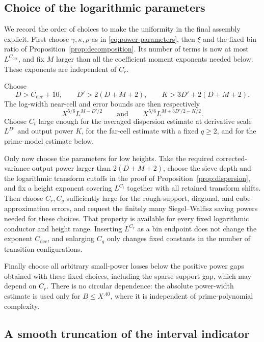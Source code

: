 \subsection{Choice of the logarithmic parameters}

We record the order of choices to make the uniformity in the final
assembly explicit. First choose \(\gamma,\kappa,\rho\) as in
\eqref{eq:power-parameters}, then \(\xi\) and the fixed bin ratio of
Proposition~\ref{prop:decomposition}. Its number of terms is now at
most \(L^{C_{\mathrm{dec}}}\), and fix \(M\) larger than all the
coefficient moment exponents needed below. These exponents are
independent of \(C_r\).

Choose
\[
 D>C_{\mathrm{dec}}+10,\qquad
 D'>2(D+M+2),\qquad
 K>3D'+2(D+M+2).
\]
The log-width near-cell and error bounds are then respectively
\[
 X^{5/6}L^{M-D'/2}\qquad\text{and}\qquad
 X^{5/6}L^{M+3D'/2-K/2}.
\]
Choose \(C_t\) large enough for
the averaged dispersion estimate at derivative scale \(L^{D'}\)
and output power \(K\), for the far-cell estimate with a fixed
\(q\ge2\), and for the prime-model estimate below.

Only now choose the parameters for low heights. Take the required
corrected-variance output power larger than \(2(D+M+2)\), choose
the sieve depth and the logarithmic transform cutoffs in the proof
of Proposition~\ref{prop:dispersion}, and fix a height exponent
covering \(L^{C_t}\) together with all retained transform shifts.
Then choose \(C_r,C_g\) sufficiently large for the rough-support,
diagonal, and cube-approximation errors, and request the finitely
many Siegel--Walfisz saving powers needed for these choices.
That property is available for every fixed logarithmic conductor and
height range. Inserting \(L^{C_r}\) as a bin endpoint does not change
the exponent \(C_{\mathrm{dec}}\), and enlarging \(C_g\) only changes
fixed constants in the number of transition configurations.

Finally choose all arbitrary small-power losses below the positive
power gaps obtained with these fixed choices, including the sparse
support gap, which may depend on \(C_r\). There is no circular
dependence: the absolute power-width estimate is used only for
\(B\le X^{.40}\), where it is independent of prime-polynomial
complexity.

\subsection{A smooth truncation of the interval indicator}

